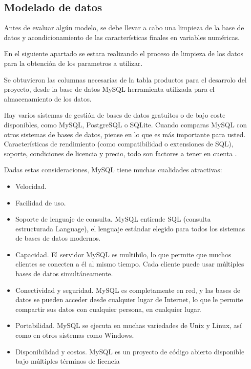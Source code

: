 \subsection{Modelado de datos}
Antes de evaluar algún modelo, se debe llevar a cabo una limpieza de la
base de datos y acondicionamiento de las características finales en variables numéricas.

\vspace{1\baselineskip}
En el siguiente apartado se estara realizando el proceso de limpieza de los datos para la obtención de los parametros a utilizar.

\vspace{1\baselineskip}

Se obtuvieron las columnas necesarias de la tabla productos para el desarrolo
del proyecto, desde la base de datos MySQL herramienta utilizada para el
almacenamiento de los datos.

\vspace{1\baselineskip}
Hay varios sistemas de gestión de bases de datos gratuitos o de bajo coste disponibles, como MySQL, PostgreSQL o SQLite. Cuando comparas MySQL con otros sistemas de bases de datos, piense en lo que es más importante para usted. Características de rendimiento (como compatibilidad o extensiones de SQL),
soporte, condiciones de licencia y precio, todo son factores a tener en cuenta \cite{dubois2013mysql}.

Dadas estas consideraciones, MySQL tiene muchas cualidades atractivas:

\begin{itemize}
  \item Velocidad.
  \item Facilidad de uso.
  \item Soporte de lenguaje de consulta. MySQL entiende SQL (consulta estructurada
        Language), el lenguaje estándar elegido para todos los sistemas de bases de
        datos modernos.
  \item Capacidad. El servidor MySQL es multihilo, lo que permite que muchos clientes se conecten a él al mismo tiempo. Cada cliente puede usar múltiples bases de datos simultáneamente.
  \item Conectividad y seguridad. MySQL es completamente en red, y las bases de datos se pueden acceder desde cualquier lugar de Internet, lo que le permite compartir sus datos con cualquier persona, en cualquier lugar.
  \item Portabilidad. MySQL se ejecuta en muchas variedades de Unix y Linux, así como en otros sistemas como Windows.
  \item Disponibilidad y costos. MySQL es un proyecto de código abierto disponible bajo múltiples términos de licencia

\end{itemize}



